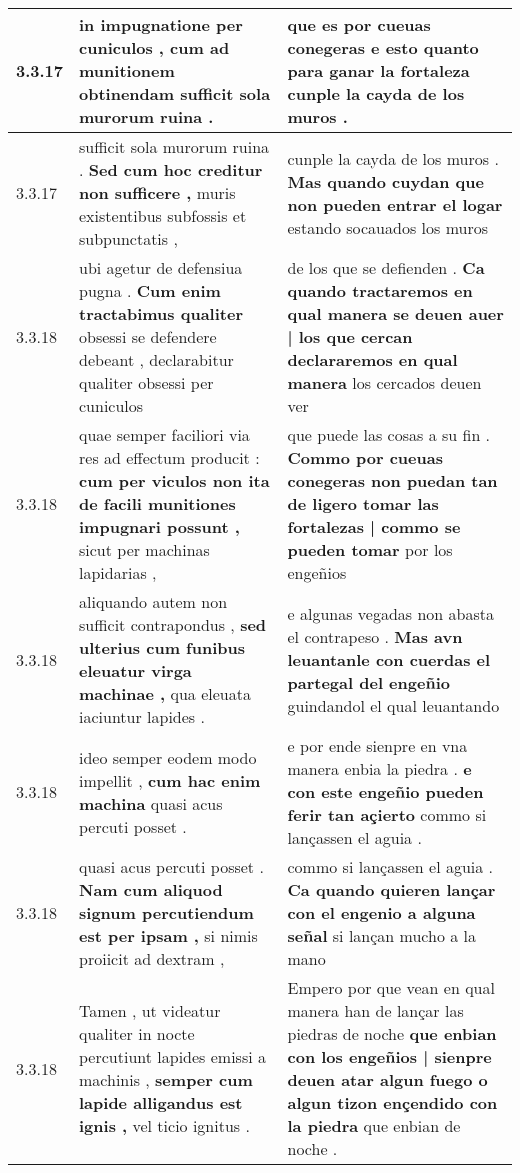 \begin{tabular}{|p{1cm}|p{6.5cm}|p{6.5cm}|}
3.3.17 & in impugnatione per cuniculos , \textbf{ cum ad munitionem obtinendam } sufficit sola murorum ruina . & que es por cueuas conegeras \textbf{ e esto quanto para ganar la fortaleza } cunple la cayda de los muros . \\\hline
3.3.17 & sufficit sola murorum ruina . \textbf{ Sed cum hoc creditur non sufficere , } muris existentibus subfossis et subpunctatis , & cunple la cayda de los muros . \textbf{ Mas quando cuydan que non pueden entrar el logar } estando socauados los muros \\\hline
3.3.18 & ubi agetur de defensiua pugna . \textbf{ Cum enim tractabimus qualiter } obsessi se defendere debeant , declarabitur qualiter obsessi per cuniculos & de los que se defienden . \textbf{ Ca quando tractaremos en qual manera se deuen auer | los que cercan declararemos en qual manera } los cercados deuen ver \\\hline
3.3.18 & quae semper faciliori via res ad effectum producit : \textbf{ cum per viculos non ita de facili munitiones impugnari possunt , } sicut per machinas lapidarias , & que puede las cosas a su fin . \textbf{ Commo por cueuas conegeras non puedan tan de ligero tomar las fortalezas | commo se pueden tomar } por los engeñios \\\hline
3.3.18 & aliquando autem non sufficit contrapondus , \textbf{ sed ulterius cum funibus eleuatur virga machinae , } qua eleuata iaciuntur lapides . & e algunas vegadas non abasta el contrapeso . \textbf{ Mas avn leuantanle con cuerdas el partegal del engeñio } guindandol el qual leuantando \\\hline
3.3.18 & ideo semper eodem modo impellit , \textbf{ cum hac enim machina } quasi acus percuti posset . & e por ende sienpre en vna manera enbia la piedra . \textbf{ e con este engeñio pueden ferir tan açierto } commo si lançassen el aguia . \\\hline
3.3.18 & quasi acus percuti posset . \textbf{ Nam cum aliquod signum percutiendum est per ipsam , } si nimis proiicit ad dextram , & commo si lançassen el aguia . \textbf{ Ca quando quieren lançar con el engenio a alguna señal } si lançan mucho a la mano \\\hline
3.3.18 & Tamen , ut videatur qualiter in nocte percutiunt lapides emissi a machinis , \textbf{ semper cum lapide alligandus est ignis , } vel ticio ignitus . & Empero por que vean en qual manera han de lançar las piedras de noche \textbf{ que enbian con los engeñios | sienpre deuen atar algun fuego o algun tizon ençendido con la piedra } que enbian de noche . \\\hline

\end{tabular}
